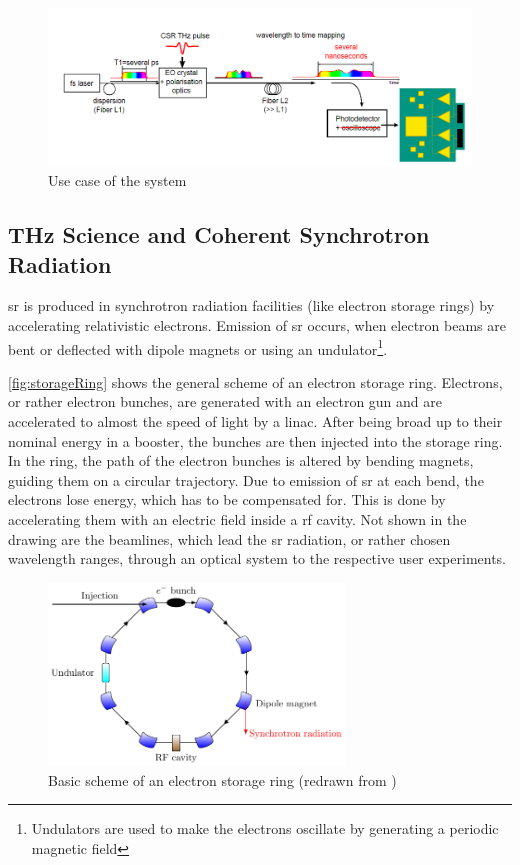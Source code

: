 \begin{figure}[tbh]
	\centering
	\includegraphics[width=\textwidth]{chap/02-theory/img/motivation}
	\caption{Use case of the system}
	\label{fig:motivation}
\end{figure}

\subsection{THz Science and Coherent Synchrotron Radiation}
\Gls{sr} is produced in synchrotron radiation facilities (like electron storage rings) by accelerating relativistic electrons.
Emission of \gls{sr} occurs, when electron beams are bent or deflected with dipole magnets or using an undulator\footnote{Undulators are used to make the electrons oscillate by generating a periodic magnetic field}. 

\autoref{fig:storageRing} shows the general scheme of an electron storage ring.
Electrons, or rather electron bunches, are generated with an electron gun and are accelerated to almost the speed of light by a \gls{linac}.
After being broad up to their nominal energy in a booster, the bunches are then injected into the storage ring.
In the ring, the path of the electron bunches is altered by bending magnets, guiding them on a circular trajectory.
Due to emission of \gls{sr} at each bend, the electrons lose energy, which has to be compensated for.
This is done by accelerating them with an electric field inside a \gls{rf} cavity.
Not shown in the drawing are the beamlines, which lead the \gls{sr} radiation, or rather chosen wavelength ranges, through an optical system to the respective user experiments. \cite{roussel2014} \cite{rota2018}

\begin{figure}[tbh]
	\centering
	\includegraphics[width=0.7\textwidth]{chap/02-theory/img/synchrotron}
	\caption{Basic scheme of an electron storage ring (redrawn from \cite{roussel2014})}
	\label{fig:storageRing}
\end{figure}


